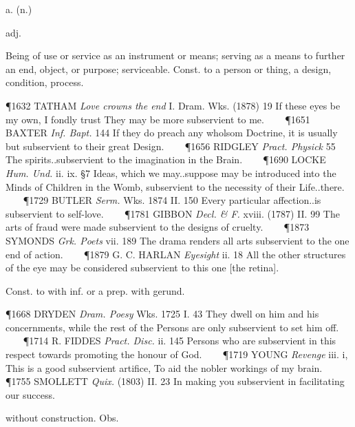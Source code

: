 \begin{description}[wide, labelwidth=!, labelindent=0pt]
 a. (n.)

\noindent {}

\vspace{-0.3cm}

\begin{myenumerate}

 adj.

 Being of use or service as an instrument or means; serving as a means to further an end, object, or purpose; serviceable. Const. to a person or thing, a design, condition, process.

\P 1632 TATHAM  \textit{Love crowns the end} I. Dram. Wks. (1878) 19 If these eyes be my own, I fondly trust They may be more subservient to me.    
\P 1651 BAXTER  \textit{Inf. Bapt.} 144 If they do preach any wholsom Doctrine, it is usually but subservient to their great Design.    
\P 1656 RIDGLEY  \textit{Pract. Physick} 55 The spirits..subservient to the imagination in the Brain.    
\P 1690 LOCKE  \textit{Hum. Und.} ii. ix. §7 Ideas, which we may..suppose may be introduced into the Minds of Children in the Womb, subservient to the necessity of their Life..there.    
\P 1729 BUTLER \textit{Serm.} Wks. 1874 II. 150  Every particular affection..is subservient to self-love.    
\P 1781 GIBBON  \textit{Decl. \& F.} xviii. (1787) II. 99 The arts of fraud were made subservient to the designs of cruelty.    
\P 1873 SYMONDS  \textit{Grk. Poets} vii. 189 The drama renders all arts subservient to the one end of action.    
\P 1879 G. C. HARLAN  \textit{Eyesight} ii. 18 All the other structures of the eye may be considered subservient to this one [the retina].

 Const. to with inf. or a prep. with gerund.

\P 1668 DRYDEN  \textit{Dram. Poesy} Wks. 1725 I. 43 They  dwell on him and his concernments, while the rest of the Persons are only subservient to set him off.    
\P 1714 R. FIDDES  \textit{Pract. Disc.} ii. 145 Persons who are subservient in this respect towards promoting the honour of God.    
\P 1719 YOUNG  \textit{Revenge} iii. i, This is a good subservient artifice, To aid the nobler workings of my brain.    
\P 1755 SMOLLETT  \textit{Quix.} (1803) II. 23 In making you subservient in facilitating our success.

 without construction. Obs.


\end{myenumerate}
\end{description}

